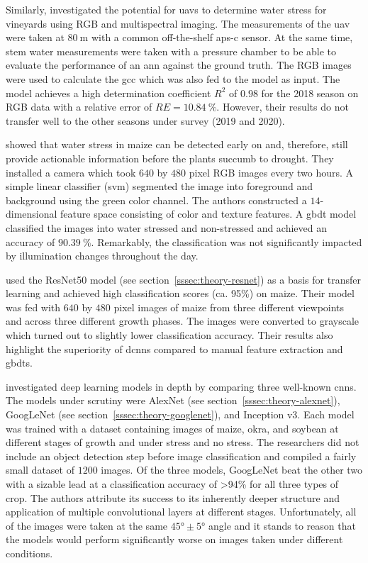 \documentclass[draft,final]{vutinfth} %
\begin{document}
Similarly, \textcite{lopez-garcia2022} investigated the potential for
\glspl{uav} to determine water stress for vineyards using RGB and
multispectral imaging. The measurements of the \gls{uav} were taken at
$\qty{80}{\meter}$ with a common off-the-shelf \gls{aps-c} sensor. At
the same time, stem water measurements were taken with a pressure
chamber to be able to evaluate the performance of an \gls{ann} against
the ground truth. The RGB images were used to calculate the \gls{gcc}
which was also fed to the model as input. The model achieves a high
determination coefficient $R^{2}$ of $0.98$ for the 2018 season on RGB
data with a relative error of $RE = \qty{10.84}{\percent}$. However,
their results do not transfer well to the other seasons under survey
(2019 and 2020).

\textcite{zhuang2017} showed that water stress in maize can be
detected early on and, therefore, still provide actionable information
before the plants succumb to drought. They installed a camera which
took $640$ by $480$ pixel RGB images every two hours. A simple linear
classifier (\gls{svm}) segmented the image into foreground and
background using the green color channel. The authors constructed a
$14$-dimensional feature space consisting of color and texture
features. A \gls{gbdt} model classified the images into water stressed
and non-stressed and achieved an accuracy of
$\qty{90.39}{\percent}$. Remarkably, the classification was not
significantly impacted by illumination changes throughout the day.

\textcite{an2019} used the ResNet50 model (see
section~\ref{sssec:theory-resnet}) as a basis for transfer learning and
achieved high classification scores (ca. 95\%) on maize. Their model
was fed with $640$ by $480$ pixel images of maize from three different
viewpoints and across three different growth phases. The images were
converted to grayscale which turned out to slightly lower
classification accuracy. Their results also highlight the superiority
of \glspl{dcnn} compared to manual feature extraction and
\glspl{gbdt}.

\textcite{chandel2021} investigated deep learning models in depth by
comparing three well-known \glspl{cnn}. The models under scrutiny were
AlexNet (see section~\ref{sssec:theory-alexnet}), GoogLeNet (see
section~\ref{sssec:theory-googlenet}), and Inception v3. Each model
was trained with a dataset containing images of maize, okra, and
soybean at different stages of growth and under stress and no
stress. The researchers did not include an object detection step
before image classification and compiled a fairly small dataset of
$1200$ images. Of the three models, GoogLeNet beat the other two with
a sizable lead at a classification accuracy of >94\% for all three
types of crop. The authors attribute its success to its inherently
deeper structure and application of multiple convolutional layers at
different stages. Unfortunately, all of the images were taken at the
same $\ang{45}\pm\ang{5}$ angle and it stands to reason that the models
would perform significantly worse on images taken under different
conditions.
\end{document}
